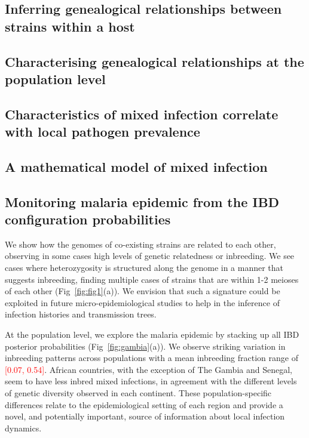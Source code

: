 \documentclass[9pt,lineno]{elife}
\begin{document}
\subsection{Inferring genealogical relationships between strains within a host}


\subsection{Characterising genealogical relationships at the population level}


\subsection{Characteristics of mixed infection correlate with local pathogen prevalence}


\subsection{A mathematical model of mixed infection}





\subsection{Monitoring malaria epidemic from the IBD configuration probabilities}


We show how the genomes of co-existing strains are related to each other, observing in some cases high levels of genetic relatedness or inbreeding. We see cases where heterozygosity is structured along the genome in a manner that suggests inbreeding, finding multiple cases of strains that are within 1-2 meioses of each other (Fig~\ref{fig:fig1}(a)). We envision that such a signature could be exploited in future micro-epidemiological studies to help in the inference of infection histories and transmission trees.

At the population level, we explore the malaria epidemic by stacking up all IBD posterior probabilities (Fig~\ref{fig:gambia}(a)). We observe striking variation in inbreeding patterns across populations with a mean inbreeding fraction range of \textcolor{red}{[0.07, 0.54]}. African countries, with the exception of The Gambia and Senegal, seem to have less inbred mixed infections, in agreement with the different levels of genetic diversity observed in each continent. These population-specific differences relate to the epidemiological setting of each region and provide a novel, and potentially important, source of information about local infection dynamics.
\end{document}
